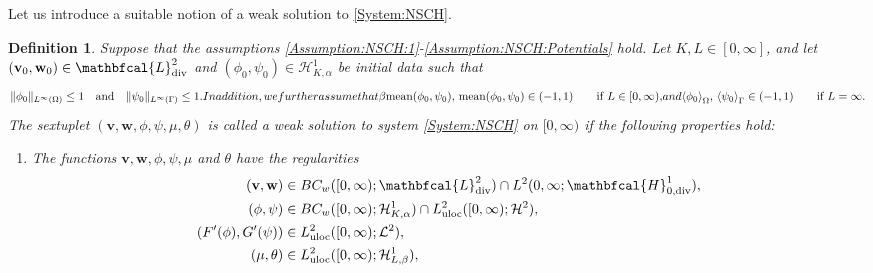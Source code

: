\documentclass[11pt,reqno]{amsart}
\newtheorem{definition}[theorem]{Definition}
\theoremstyle{remark}
\numberwithin{equation}{section}
\newcommand{\norm}[1]{\| #1 \|}
\newcommand{\meano}[1]{{\langle #1 \rangle}_{\Omega}}
\newcommand{\meang}[1]{{\langle #1 \rangle}_{\Gamma}}
\newcommand{\mean}[2]{\textnormal{mean}(#1,#2)}
\newcommand{\Div}{\textnormal{div}}
\newcommand{\Om}{\Omega}
\newcommand{\Ga}{\Gamma}
\newcommand{\bv}{\mathbf v}
\newcommand{\bw}{\mathbf w}
\newcommand{\uloc}{\mathrm{uloc}}
\begin{document}
Let us introduce a suitable notion of a weak solution to \eqref{System:NSCH}.

\begin{definition}\label{NSCH:Definition:WeakSolution}
Suppose that the assumptions \ref{Assumption:NSCH:1}-\ref{Assumption:NSCH:Potentials} hold. Let $K,L\in[0,\infty]$, and let $(\bv_0,\bw_0)\in\mathbfcal{L}^2_\Div$ and $(\phi_0,\psi_0)\in\mathcal{H}^1_{K,\alpha}$ be initial data such that 
    \begin{subequations}\label{NSCH:cond:init}
        \begin{align}\label{NSCH:cond:init:int}
            \norm{\phi_0}_{L^\infty(\Om)} \leq 1 \quad\text{and}\quad \norm{\psi_0}_{L^\infty(\Ga)} \leq 1.
        \end{align}
        In addition, we further assume that
        \begin{align}\label{NSCH:cond:init:mean:L}
            \beta\mean{\phi_0}{\psi_0}, \,\mean{\phi_0}{\psi_0}\in(-1,1)  \qquad\text{if~} L\in[0,\infty),
        \end{align}
        and
        \begin{align}\label{NSCH:cond:init:mean:infty}
            \meano{\phi_0},\, \meang{\psi_0}\in(-1,1) \qquad\text{if~} L = \infty.
        \end{align}
    \end{subequations}
    The sextuplet $(\bv,\bw,\phi,\psi,\mu,\theta)$ is called a weak solution to system \eqref{System:NSCH} on $[0,\infty)$ if the following properties hold:
    \begin{enumerate}[label=\textnormal{(\roman*)}, ref=\thetheorem(\roman*)]
        \item \label{NSCH:WeakSolution:REG} The functions $\bv, \bw, \phi, \psi, \mu$ and $\theta$ have the regularities
        \begin{subequations}
            \begin{align}
                (\bv,\bw) &\in BC_w([0,\infty);\mathbfcal{L}^2_\Div)\cap L^2(0,\infty;\mathbfcal{H}^1_{0,\Div}), \label{NSCH:REG:VW}\\
                (\phi,\psi) &\in BC_w([0,\infty);\mathcal{H}_{K,\alpha}^1)\cap L^2_\uloc([0,\infty);\mathcal{H}^2), \label{NSCH:REG:PP}\\
                (F^\prime(\phi),G^\prime(\psi))&\in L^2_\uloc([0,\infty);\mathcal{L}^2),\label{NSCH:REG:POT}\\
                (\mu,\theta)&\in L^2_\uloc([0,\infty);\mathcal{H}_{L,\beta}^1), \label{NSCH:REG:MT}
            \end{align}

\end{subequations}
\end{enumerate}
\end{definition}
\end{document}
